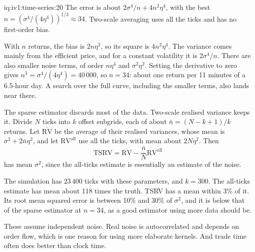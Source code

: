 \begin{solution}{iq:iv1:time-series:20}
The error is about $2\sigma^4/n + 4n^2\eta^4$, with the best $n = (\sigma^4/(4\eta^4))^{1/3} \approx 34$. Two-scale averaging uses all the ticks and has no first-order bias.

With $n$ returns, the bias is $2n\eta^2$, so its square is $4n^2\eta^4$. The variance comes mainly from the efficient price, and for a constant volatility it is $2\sigma^4/n$. There are also smaller noise terms, of order $n\eta^4$ and $\sigma^2\eta^2$. Setting the derivative to zero gives $n^3 = \sigma^4/(4\eta^4) = 40\,000$, so $n = 34$: about one return per 11 minutes of a 6.5-hour day. A search over the full curve, including the smaller terms, also lands near there.

The sparse estimator discards most of the data. Two-scale realised variance keeps it. Divide $N$ ticks into $k$ offset subgrids, each of about $\bar{n} = (N - k + 1)/k$ returns. Let $\overline{\mathrm{RV}}$ be the average of their realised variances, whose mean is $\sigma^2 + 2\bar{n}\eta^2$, and let $\mathrm{RV}^{\text{all}}$ use all the ticks, with mean about $2N\eta^2$. Then
\[
\mathrm{TSRV} = \overline{\mathrm{RV}} - \frac{\bar{n}}{N}\mathrm{RV}^{\text{all}}
\]
has mean $\sigma^2$, since the all-ticks estimate is essentially an estimate of the noise.

The simulation has $23\,400$ ticks with these parameters, and $k = 300$. The all-ticks estimate has mean about 118 times the truth. TSRV has a mean within 3\% of it. Its root mean squared error is between 10\% and 30\% of $\sigma^2$, and it is below that of the sparse estimator at $n = 34$, as a good estimator using more data should be.

These assume independent noise. Real noise is autocorrelated and depends on order flow, which is one reason for using more elaborate kernels. And trade time often does better than clock time.



\end{solution}

